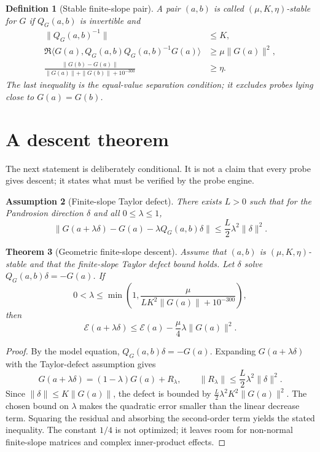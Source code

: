 \documentclass[11pt]{article}
\newtheorem{definition}{Definition}[section]
\newtheorem{assumption}[definition]{Assumption}
\newtheorem{theorem}[definition]{Theorem}
\newcommand{\E}{\mathcal{E}}
\newcommand{\Q}{Q_G}
\begin{document}
\begin{definition}[Stable finite-slope pair]
A pair $(a,b)$ is called $(\mu,K,\eta)$-stable for $G$ if $\Q(a,b)$ is invertible and
\begin{align}
    \|\Q(a,b)^{-1}\| &\le K,\\
    \Re\langle G(a),\Q(a,b)\Q(a,b)^{-1}G(a)\rangle &\ge \mu\|G(a)\|^2,\\
    \frac{\|G(b)-G(a)\|}{\|G(a)\|+\|G(b)\|+10^{-300}} &\ge \eta.
\end{align}
The last inequality is the equal-value separation condition; it excludes probes lying close to $G(a)=G(b)$.
\end{definition}

\section{A descent theorem}
The next statement is deliberately conditional. It is not a claim that every probe gives descent; it states what must be verified by the probe engine.

\begin{assumption}[Finite-slope Taylor defect]
There exists $L>0$ such that for the Pandrosion direction $\delta$ and all $0\le \lambda\le 1$,
\begin{equation}
\|G(a+\lambda\delta)-G(a)-\lambda\Q(a,b)\delta\|\le \frac{L}{2}\lambda^2\|\delta\|^2.
\end{equation}
\end{assumption}

\begin{theorem}[Geometric finite-slope descent]
Assume that $(a,b)$ is $(\mu,K,\eta)$-stable and that the finite-slope Taylor defect bound holds. Let $\delta$ solve $\Q(a,b)\delta=-G(a)$. If
\begin{equation}
0<\lambda\le \min\left(1,\frac{\mu}{L K^2\|G(a)\|+10^{-300}}\right),
\end{equation}
then
\begin{equation}
    \E(a+\lambda\delta)\le \E(a)-\frac{\mu}{4}\lambda\|G(a)\|^2.
\end{equation}
\end{theorem}

\begin{proof}
By the model equation, $\Q(a,b)\delta=-G(a)$. Expanding $G(a+\lambda\delta)$ with the Taylor-defect assumption gives
\begin{equation}
G(a+\lambda\delta)=(1-\lambda)G(a)+R_\lambda,
\qquad \|R_\lambda\|\le \frac{L}{2}\lambda^2\|\delta\|^2.
\end{equation}
Since $\|\delta\|\le K\|G(a)\|$, the defect is bounded by $\frac{L}{2}\lambda^2K^2\|G(a)\|^2$. The chosen bound on $\lambda$ makes the quadratic error smaller than the linear decrease term. Squaring the residual and absorbing the second-order term yields the stated inequality. The constant $1/4$ is not optimized; it leaves room for non-normal finite-slope matrices and complex inner-product effects.
\end{proof}
\end{document}
